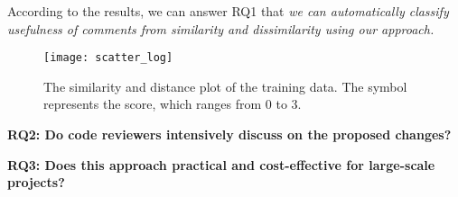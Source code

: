 According to the results, we can answer  RQ1 that \textit{we can automatically classify usefulness of comments from similarity and dissimilarity using our approach.}



\begin{figure}[!t]
\centering
\texttt{[image: scatter\_log]}
\caption{The similarity and distance plot of the training data.
The symbol represents the score, which ranges from 0 to 3.}
\label{fig:scatter}
\end{figure}

\noindent \textbf{RQ2: Do code reviewers intensively discuss on the proposed changes?}\\


\noindent \textbf{RQ3: Does this approach practical and cost-effective for large-scale projects?}\\



